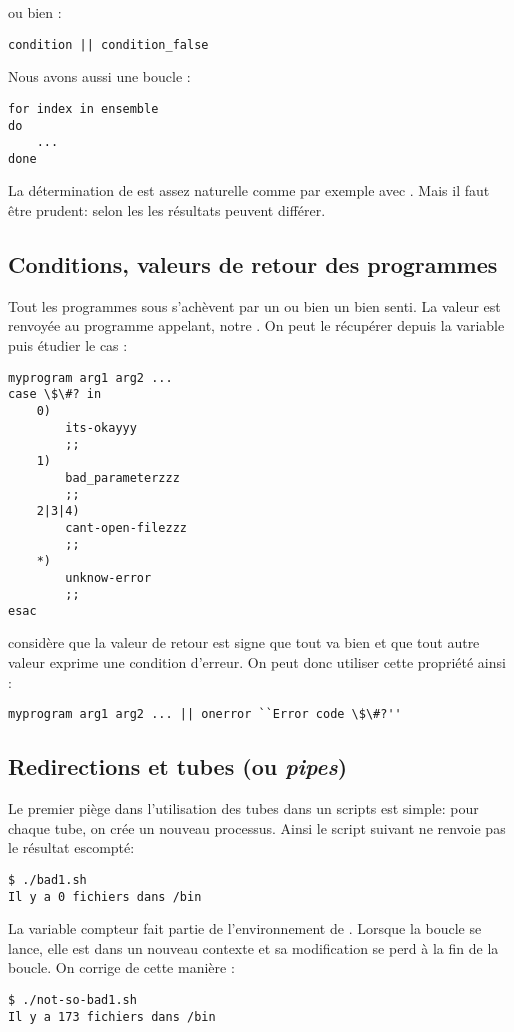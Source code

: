 ou bien :
\begin{lstlisting}
condition || condition_false
\end{lstlisting}

Nous avons aussi une boucle  :
\begin{lstlisting}
for index in ensemble
do
	...
done
\end{lstlisting}

La détermination de  est assez naturelle comme par exemple avec . Mais il faut être prudent: selon les \shells les résultats peuvent différer.

\subsection{Conditions, valeurs de retour des programmes}

Tout les programmes sous \unix s'achèvent par un  ou bien un  bien senti. La valeur  est renvoyée au programme appelant, notre \shell. On peut le récupérer depuis la variable  puis étudier le cas :
\begin{lstlisting}
myprogram arg1 arg2 ...
case \$\#? in
	0)
		its-okayyy
		;;
	1)
		bad_parameterzzz
		;;
	2|3|4)
		cant-open-filezzz
		;;
	*)
		unknow-error
		;;
esac
\end{lstlisting}

\unix considère que la valeur de retour  est signe que tout va bien et que tout autre valeur exprime une condition d'erreur. On peut donc utiliser cette propriété ainsi :

\begin{lstlisting}
myprogram arg1 arg2 ... || onerror ``Error code \$\#?''
\end{lstlisting}

\subsection{Redirections et tubes (ou \emph{pipes})}
Le premier piège dans l'utilisation des tubes dans un scripts est simple: pour chaque tube, on crée un nouveau processus. Ainsi le script suivant ne renvoie pas le résultat escompté:



\begin{lstlisting}
$ ./bad1.sh
Il y a 0 fichiers dans /bin
\end{lstlisting}

La variable compteur fait partie de l'environnement de . Lorsque la boucle  se lance, elle est dans un nouveau contexte et sa modification se perd à la fin de la boucle. On corrige de cette manière :



\begin{lstlisting}
$ ./not-so-bad1.sh
Il y a 173 fichiers dans /bin
\end{lstlisting}


